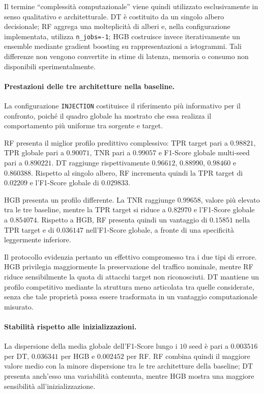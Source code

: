 Il termine ``complessità computazionale'' viene quindi utilizzato esclusivamente in senso qualitativo e architetturale. 
DT è costituito da un singolo albero decisionale; RF aggrega una molteplicità di alberi e, nella configurazione implementata, utilizza \texttt{n\_jobs=-1}; HGB costruisce invece iterativamente un ensemble mediante gradient boosting su rappresentazioni a istogrammi. 
Tali differenze non vengono convertite in stime di latenza, memoria o consumo non disponibili sperimentalmente.

\paragraph{Prestazioni delle tre architetture nella baseline.}
La configurazione \texttt{INJECTION} costituisce il riferimento più informativo per il confronto, poiché il quadro globale ha mostrato che essa realizza il comportamento più uniforme tra sorgente e target.

RF presenta il miglior profilo predittivo complessivo: TPR target pari a $0.98821$, TPR globale pari a $0.90071$, TNR pari a $0.99057$ e F1-Score globale multi-seed pari a $0.890221$. 
DT raggiunge rispettivamente $0.96612$, $0.88990$, $0.98460$ e $0.860388$. 
Rispetto al singolo albero, RF incrementa quindi la TPR target di $0.02209$ e l'F1-Score globale di $0.029833$.

HGB presenta un profilo differente. 
La TNR raggiunge $0.99658$, valore più elevato tra le tre baseline, mentre la TPR target si riduce a $0.82970$ e l'F1-Score globale a $0.854074$. 
Rispetto a HGB, RF presenta quindi un vantaggio di $0.15851$ nella TPR target e di $0.036147$ nell'F1-Score globale, a fronte di una specificità leggermente inferiore.

Il protocollo evidenzia pertanto un effettivo compromesso tra i due tipi di errore. 
HGB privilegia maggiormente la preservazione del traffico nominale, mentre RF riduce sensibilmente la quota di attacchi target non riconosciuti.
DT mantiene un profilo competitivo mediante la struttura meno articolata tra quelle considerate, senza che tale proprietà possa essere trasformata in un vantaggio computazionale misurato.

\paragraph{Stabilità rispetto alle inizializzazioni.}
La dispersione della media globale dell'F1-Score lungo i $10$ seed è pari a $0.003516$ per DT, $0.036341$ per HGB e $0.002452$ per RF. 
RF combina quindi il maggiore valore medio con la minore dispersione tra le tre architetture della baseline; DT presenta anch'esso una variabilità contenuta, mentre HGB mostra una maggiore sensibilità all'inizializzazione.

